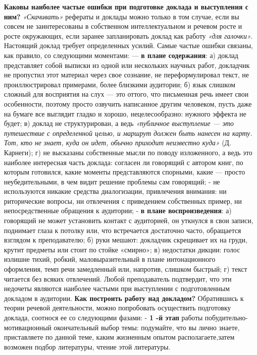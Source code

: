 {{\textbf{Каковы наиболее частые ошибки при подготовке доклада и выступления с ним?}
\textit{ «Скачивать»} рефераты и доклады можно только в том случае, если вы совсем не заинтересованы в собственном интеллектуальном и речевом росте и росте окружающих, если заранее запланировать доклад как работу \textit{«для галочки»}.
Настоящий доклад требует определенных усилий. Самые частые ошибки связаны, как правило, со следующими моментами:
— \textbf{в плане содержания}: а) доклад представляет собой выписки из одной или нескольких научных работ, докладчик не пропустил этот материал через свое сознание, не переформулировал текст, не проиллюстрировал примерами, более близкими аудитории; б) язык слишком сложный для восприятия на слух — это оттого, что письменная речь имеет свои особенности, поэтому просто озвучить написанное другим человеком, пусть даже на бумаге все выглядит гладко и хорошо, нецелесообразно: нужного эффекта не будет; в) доклад не структурирован, а ведь \textit{«публичное выступление — это путешествие с определенной целью, и маршрут должен быть нанесен на карту. Тот, кто не знает, куда он идет, обычно приходит неизвестно куда»} (Д. Карнеги); г) не высказаны собственные мысли по поводу изложенного, а ведь это наиболее интересная часть доклада: согласен ли говорящий с автором книг, по которым готовился, какие моменты представляются спорными, какие — просто неубедительными, в чем видит решение проблемы сам говорящий; - не используются никакие средства диалогизации, привлечения внимания: ни риторические вопросы, ни отвлечения с приведением собственных пример, ни непосредственные обращения к аудитории;
-  \textbf{в плане воспроизведения}: а) говорящий не может установить контакт с аудиторией, он уткнулся в свои записи, поднимает глаза к потолку или, что встречается достаточно часто, обращается взглядом к преподавателю; б) руки мешают: докладчик скрещивает их на груди, крутит предметы или стоит по стойке «смирно»; в) недостатки дикции: голос излишне тихий, робкий, маловыразительный в плане интонационного оформления, темп речи замедленный или, напротив, слишком быстрый; г) текст читается без всяких отвлечений. Любой преподаватель подтвердит, что эти недочеты являются наиболее частыми при выступлении с подготовленным докладом в аудитории.
 \textbf{Как построить работу над докладом?}
Обратившись к теории речевой деятельности, можно попробовать осуществить подготовку доклада, соотнося ее со следующими фазами:
-  \textbf{1 -й этап} работы побудительно-мотивационный окончательный выбор темы: подумайте, что вы лично знаете, приставляете по данной теме, каким жизненным опытом располагаете,затем возможен подбор литературы, чтение этой литературы.
}}
